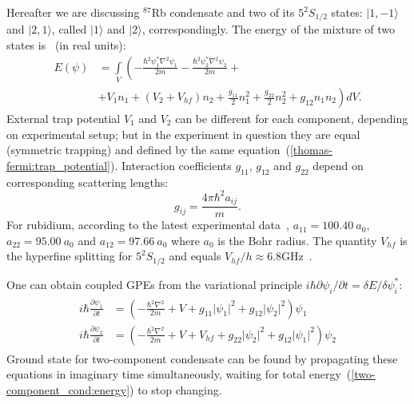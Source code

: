 \documentclass[12pt,notitlepage]{report}
\begin{document}
Hereafter we are discussing $^{87}$Rb condensate and two of its $5^2S_{1/2}$ states: $\vert1,-1\rangle$ and $\vert2,1\rangle$,
called $\vert1\rangle$ and $\vert2\rangle$, correspondingly.
The energy of the mixture of two states is~\cite{pitaevskii_bec} (in real units):
\begin{equation}
\label{two-component_cond:energy}
\begin{split}
E(\psi) & = \int\limits_V \left(
-\frac{\hbar^2 \psi_1^* \nabla^2 \psi_1}{2m} - \frac{\hbar^2 \psi_2^* \nabla^2 \psi_2}{2m} + \right. \\
& \left. + V_1 n_1 + ( V_2 + V_{hf} ) n_2 + \frac{g_{11}}{2} n_1^2 + \frac{g_{22}}{2} n_2^2 + g_{12} n_1 n_2
\right) dV.
\end{split}
\end{equation}
External trap potential $V_1$ and $V_2$ can be different for each component, depending on experimental setup;
but in the experiment in question they are equal (symmetric trapping)
and defined by the same equation~(\ref{thomas-fermi:trap_potential}).
Interaction coefficients $g_{11}$, $g_{12}$ and $g_{22}$ depend on corresponding scattering lengths:
\[ g_{ij} = \frac{4 \pi \hbar^2 a_{ij}}{m}. \]
For rubidium, according to the latest experimental data~\cite{mertes_merrill_carretero-gonzalez_frantzeskakis_kevrekidis_hall_2007},
$a_{11} = 100.40\ a_0$, $a_{22} = 95.00\ a_0$ and $a_{12} = 97.66\ a_0$ where $a_0$ is the Bohr radius.
The quantity $V_{hf}$ is the hyperfine splitting for $5^2S_{1/2}$ and equals $V_{hf} / h \approx 6.8 \textrm{GHz}$~\cite{steck_2009}.

One can obtain coupled GPEs from the variational principle $i \hbar \partial \psi_i / \partial t = \delta E / \delta \psi_i^*$:
\begin{align}
\label{two-component_cond:cgpes}
\begin{split}
i \hbar \frac{\partial \psi_1}{\partial t} & = \left( - \frac{\hbar^2 \nabla^2}{2 m} + V +
g_{11} \lvert \psi_1 \rvert^2 + g_{12} \lvert \psi_2 \rvert^2 \right) \psi_1 \\
i \hbar \frac{\partial \psi_2}{\partial t} & = \left( - \frac{\hbar^2 \nabla^2}{2 m} + V + V_{hf} +
g_{22} \lvert \psi_2 \rvert^2 + g_{12} \lvert \psi_1 \rvert^2 \right) \psi_2
\end{split}
\end{align}
Ground state for two-component condensate can be found by propagating these equations in imaginary time simultaneously,
waiting for total energy~(\ref{two-component_cond:energy}) to stop changing.
\end{document}
